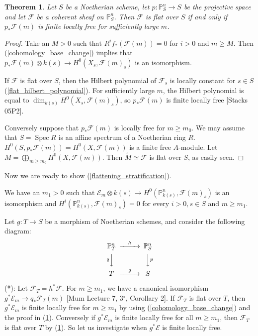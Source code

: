 \documentclass{article}
\theoremstyle{theorem}
\newtheorem{theorem}{Theorem}[section]
\begin{document}
    \begin{theorem} \label{projective_flat}
        Let $S$ be a Noetherian scheme, let $p : \mathbb P^n_S \rightarrow S$ be the projective space and let $\mathcal F$ be a coherent sheaf on $\mathbb P^n_S$. Then $\mathcal F$ is flat over $S$ if and only if $p_* \mathcal F(m)$ is finite locally free for sufficiently large $m$.
    \end{theorem}
    \begin{proof}
        Take an $M > 0$ such that $R^if_*(\mathcal F(m)) = 0$ for $i > 0$ and $m \geq M$. Then  (\ref{cohomology_base_change}) implies that $p_*\mathcal F(m) \otimes k(s) \rightarrow H^0(X_s, \mathcal F(m)_s)$ is an isomorphism.
        
        If $\mathcal F$ is flat over $S$, then the Hilbert polynomial of $\mathcal F_s$ is locally constant for $s \in S$ (\ref{flat_hilbert_polynomial}). For sufficiently large $m$, the Hilbert polynomial is equal to $\dim_{k(s)} H^0(X_s, \mathcal F(m)_s)$, so $p_* \mathcal F(m)$ is finite locally free [Stacks 05P2].
        
        Conversely suppose that $p_*\mathcal F(m)$ is locally free for $m \geq m_0$.  We may assume that $S = \operatorname{Spec} R$ is an affine spectrum of a Noetherian ring $R$. $H^0(S, p_*\mathcal F(m)) = H^0(X, \mathcal F(m))$ is a finite free $A$-module. Let $\displaystyle M = \bigoplus_{m \geq m_0} H^0(X, \mathcal F(m)).$ Then $\widetilde{M} \simeq \mathcal F$ is flat over $S$, as easily seen.
    \end{proof}
    
    Now we are ready to show (\ref{flattening_stratification}).
    
    We have an $m_1 > 0$ such that $\mathcal E_m \otimes k(s) \rightarrow H^0(\mathbb P^n_{k(s)}, \mathcal F(m)_s)$ is an isomorphism and $H^i(\mathbb P^n_{k(s)}, \mathcal F(m)_s) = 0$ for every $i > 0, s \in S$ and $m \geq m_1$.
    
    Let $g : T \rightarrow S$ be a morphism of Noetherian schemes, and consider the following diagram:
    \[
      \begin{CD}
         \mathbb  P^n_T @>{h}>> \mathbb  P^n_S \\
      @V{q}VV    @VV{p}V \\
         T   @>{g}>>  S
      \end{CD}
    \]
    \newline
    
    (*): Let $\mathcal F_T = h^*\mathcal F$. For $m \geq m_1$, we have a canonical isomorphism $g^* \mathcal E_m \rightarrow q_*\mathcal F_T(m)$ {[Mum Lecture 7, 3$^\circ$, Corollary 2]}. If $\mathcal F_T$ is flat over $T$, then $g^* \mathcal E_m$ is finite locally free for $m \geq m_1$ by using (\ref{cohomology_base_change}) and the proof in (\ref{projective_flat}). Conversely if $g^* \mathcal E_m$ is finite locally free for all $m \geq m_1$, then $\mathcal F_T$ is flat over $T$ by (\ref{projective_flat}). So let us investigate when $g^*\mathcal E$ is finite locally free.
    \newline
    
\end{document}
